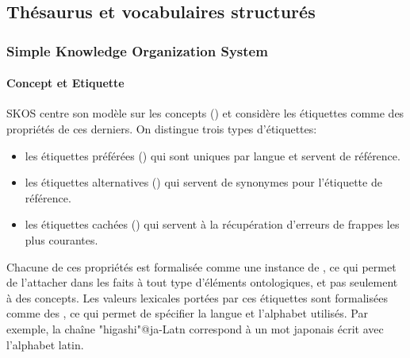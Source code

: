 \subsection{Thésaurus et vocabulaires structurés}\label{sec:thesaurus}
\subsubsection{Simple Knowledge Organization System}\label{sec:skos}

\paragraph{Concept et Etiquette}
SKOS centre son modèle sur les concepts () et considère les étiquettes comme des propriétés de ces derniers. 
On distingue trois types d'étiquettes: 
\begin{itemize} 
	\item les étiquettes préférées () qui sont uniques par langue et servent de référence.
	\item les étiquettes alternatives () qui servent de synonymes pour l'étiquette de référence. 
	\item les étiquettes cachées () qui servent à la récupération d'erreurs de frappes les plus courantes. 
\end{itemize}
Chacune de ces propriétés est formalisée comme une instance de , ce qui permet de l'attacher dans les faits à tout type d'éléments ontologiques, et pas seulement à des concepts. 
Les valeurs lexicales portées par ces étiquettes sont formalisées comme des , ce qui permet de spécifier la langue et l'alphabet utilisés. 
Par exemple, la chaîne "higashi"@ja-Latn correspond à un mot japonais écrit avec l'alphabet latin.

